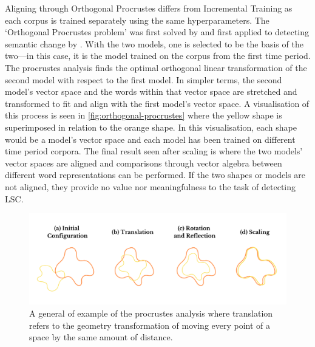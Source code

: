 Aligning through Orthogonal Procrustes differs from Incremental Training as each corpus is trained separately using the same hyperparameters. The `Orthogonal Procrustes problem' was first solved by \citet{schonemann1966} and first applied to detecting semantic change by \citet{hamilton-etal-2016-diachronic}. With the two models, one is selected to be the basis of the two—in this case, it is the model trained on the corpus from the first time period. The procrustes analysis finds the optimal orthogonal linear transformation of the second model with respect to the first model. In simpler terms, the second model’s vector space and the words within that vector space are stretched and transformed to fit and align with the first model’s vector space. A visualisation of this process is seen in \autoref{fig:orthogonal-procrustes} where the yellow shape is superimposed in relation to the orange shape. In this visualisation, each shape would be a model's vector space and each model has been trained on different time period corpora. The final result seen after scaling is where the two models' vector spaces are aligned and comparisons through vector algebra between different word representations can be performed. If the two shapes or models are not aligned, they provide no value nor meaningfulness to the task of detecting LSC. 

\begin{figure}[h]
  \centering
  \includegraphics[width=1\linewidth]{sections/figures/orthogonal-procrustes.png}
  \caption{A general of example of the procrustes analysis where translation refers to the geometry transformation of moving every point of a space by the same amount of distance.}
  \label{fig:orthogonal-procrustes}
\end{figure}



